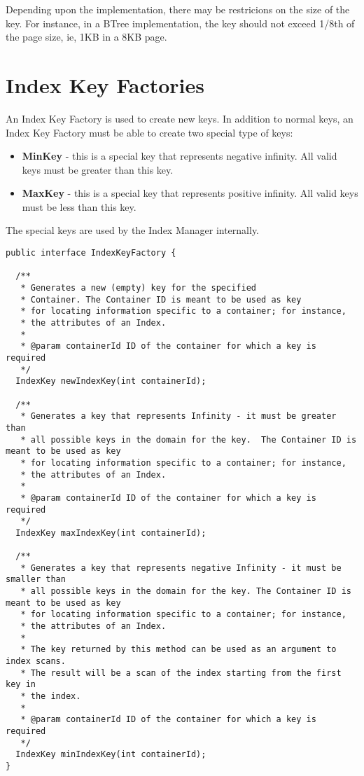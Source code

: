 \documentclass[a4paper,draft,oneside]{book}
\begin{document}
Depending upon the implementation, there may be restricions on the
size of the key. For instance, in a BTree implementation, the key
should not exceed 1/8th of the page size, ie, 1KB in a 8KB page. 

\section{Index Key Factories}

An Index Key Factory is used to create new keys. In addition to normal keys, an Index
Key Factory must be able to create two special type of keys:

\begin{itemize}
	\item \textbf{MinKey} - this is a special key that represents negative infinity. All valid keys must be greater than this key.
	\item \textbf{MaxKey} - this is a special key that represents positive infinity. All valid keys must be less than this key.
\end{itemize}

The special keys are used by the Index Manager internally.

\begin{verbatim}
public interface IndexKeyFactory {

  /**
   * Generates a new (empty) key for the specified
   * Container. The Container ID is meant to be used as key
   * for locating information specific to a container; for instance,
   * the attributes of an Index.
   * 
   * @param containerId ID of the container for which a key is required
   */
  IndexKey newIndexKey(int containerId);

  /**
   * Generates a key that represents Infinity - it must be greater than
   * all possible keys in the domain for the key.  The Container ID is meant to be used as key
   * for locating information specific to a container; for instance,
   * the attributes of an Index.
   * 
   * @param containerId ID of the container for which a key is required
   */
  IndexKey maxIndexKey(int containerId);
	
  /**
   * Generates a key that represents negative Infinity - it must be smaller than
   * all possible keys in the domain for the key. The Container ID is meant to be used as key
   * for locating information specific to a container; for instance,
   * the attributes of an Index.
   *
   * The key returned by this method can be used as an argument to index scans.
   * The result will be a scan of the index starting from the first key in 
   * the index.
   * 
   * @param containerId ID of the container for which a key is required
   */
  IndexKey minIndexKey(int containerId);
}
\end{verbatim}
\end{document}
